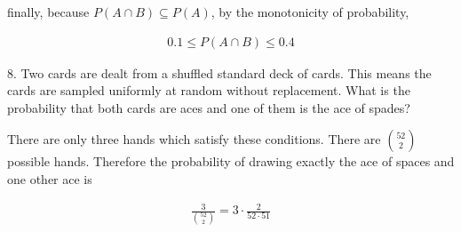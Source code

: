 \documentclass{article}
\begin{document}
finally, because $P(A \cap B) \subseteq P(A)$, by the monotonicity of probability, 

\begin{align*}
    0.1 \leq P(A \cap B) \leq 0.4
\end{align*}

\vspace{5mm}

8. Two cards are dealt from a shuffled standard deck of cards. This means the cards are
sampled uniformly at random without replacement. What is the probability that both
cards are aces and one of them is the ace of spades?

\vspace{5mm}

There are only three hands which satisfy these conditions. There are $\binom{52}{2}$ possible hands.
Therefore the probability of drawing exactly the ace of spaces and one other ace is

\begin{align*}
    \frac{3}{\binom{52}{2}} = 3 \cdot \frac{2}{52\cdot51}
\end{align*}
\end{document}
